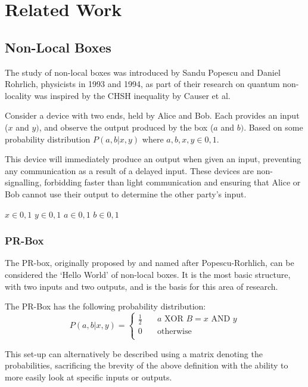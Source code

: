 \documentclass[report.tex]{subfiles}
\begin{document}
\chapter{Related Work} %
\label{cha:related_work}


\section{Non-Local Boxes} %
\label{sec:non_local_boxes}
The study of non-local boxes was introduced by Sandu Popescu and Daniel
Rohrlich, physicists in 1993 and 1994, as part of their research on quantum
non-locality was inspired by the CHSH inequality by Causer et al.


Consider a device with two ends, held by Alice and Bob. Each provides an
input (\(x\) and \(y)\), and observe the output produced by the box (\(a\) and
\(b)\). Based on some probability distribution \(P(a,b | x,y)\) where \(a, b, x,
y \in {0, 1}\). 

This device will immediately produce an output when given an input, preventing
any communication as a result of a delayed input. These devices are
non-signalling, forbidding faster than light communication and ensuring that
Alice or Bob cannot use their output to determine the other party's input.

\(x \in {0, 1}\) \(y \in {0, 1}\)
\(a \in {0, 1}\) \(b \in {0, 1}\)


\subsection{PR-Box} %
\label{sub:pr_box}
The PR-box, originally proposed by and named after Popescu-Rorhlich, can be
considered the `Hello World' of non-local boxes. It is the most basic structure,
with two inputs and two outputs, and is the basis for this area of research.

The PR-Box has the following probability distribution:
\[
    P(a, b | x, y) = 
    \begin{cases}
        \frac{1}{2} & \quad a \text{ XOR } B = x \text{ AND } y \\
        0 & \quad \text{otherwise} \\
    \end{cases}
\]

This set-up can alternatively be described using a matrix denoting the 
probabilities, sacrificing the brevity of the above definition with the ability
to more easily look at specific inputs or outputs.
\end{document}
